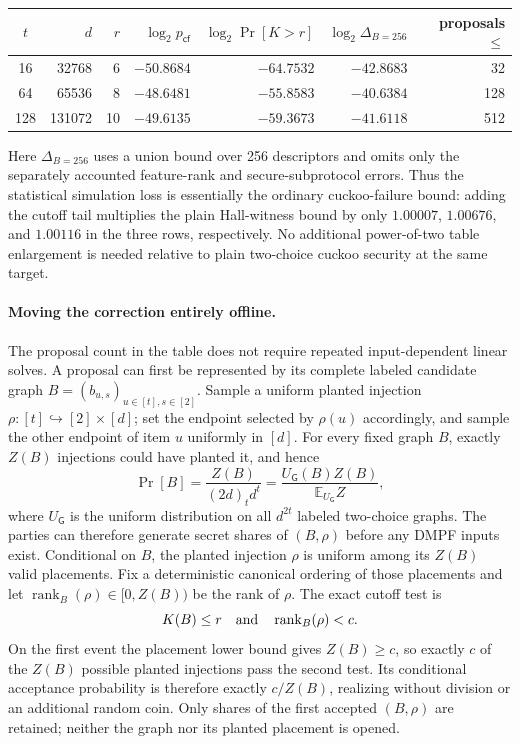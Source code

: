 \begin{center}
\begin{tabular}{c|r|r|r|r|r|r}
 $t$ & $d$ & $r$ & $\log_2 p_{\mathsf{cf}}$
     & $\log_2\Pr[K>r]$ & $\log_2\Delta_{B=256}$
     & proposals $\leq$ \\ \hline
 16  & 32768  & 6  & $-50.8684$ & $-64.7532$ & $-42.8683$ & 32 \\
 64  & 65536  & 8  & $-48.6481$ & $-55.8583$ & $-40.6384$ & 128 \\
 128 & 131072 & 10 & $-49.6135$ & $-59.3673$ & $-41.6118$ & 512
\end{tabular}
\end{center}
Here $\Delta_{B=256}$ uses a union bound over 256 descriptors and omits only
the separately accounted feature-rank and secure-subprotocol errors.  Thus
the statistical simulation loss is essentially the ordinary cuckoo-failure
bound: adding the cutoff tail multiplies the plain Hall-witness bound by only
$1.00007$, $1.00676$, and $1.00116$ in the three rows, respectively.  No
additional power-of-two table enlargement is needed relative to
plain two-choice cuckoo security at the same target.

\paragraph{Moving the correction entirely offline.}
The proposal count in the table does not require repeated input-dependent
linear solves.  A proposal can first be represented by its complete labeled
candidate graph $B=(b_{u,s})_{u\in[t],s\in[2]}$.  Sample a uniform planted
injection $\rho:[t]\hookrightarrow[2]\times[d]$; set the endpoint selected by
$\rho(u)$ accordingly, and sample the other endpoint of item $u$ uniformly in
$[d]$.  For every fixed graph $B$, exactly $Z(B)$ injections could have
planted it, and hence
\[
 \Pr[B]=\frac{Z(B)}{(2d)_t d^t}
       =\frac{U_{\mathsf G}(B)Z(B)}{\mathbb E_{U_{\mathsf G}}Z},
\]
where $U_{\mathsf G}$ is the uniform distribution on all $d^{2t}$ labeled
two-choice graphs.  The parties can therefore generate secret shares of
$(B,\rho)$ before any DMPF inputs exist.  Conditional on $B$, the planted
injection $\rho$ is uniform among its $Z(B)$ valid placements.  Fix a
deterministic canonical ordering of those placements and let
$\operatorname{rank}_B(\rho)\in[0,Z(B))$ be the rank of $\rho$.  The exact
cutoff test is
\begin{equation}\label{eq:rev-cuckoo-rank-accept}
 K(B)\leq r
 \quad\textnormal{and}\quad
 \operatorname{rank}_B(\rho)<c.
\end{equation}
On the first event the placement lower bound gives $Z(B)\geq c$, so exactly
$c$ of the $Z(B)$ possible planted injections pass the second test.  Its
conditional acceptance probability is therefore exactly $c/Z(B)$, realizing
 without division or an additional
random coin.  Only shares of the first accepted $(B,\rho)$ are retained;
neither the graph nor its planted placement is opened.

